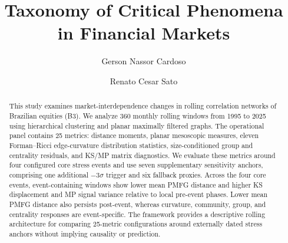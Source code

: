 \documentclass[a4paper,fleqn,review]{cas-sc}
\begin{document}
\let\WriteBookmarks\relax
\def\floatpagepagefraction{1}
\def\textpagefraction{.001}

\title[mode = title]{Taxonomy of Critical Phenomena in Financial Markets}

\author[1]{Gerson Nassor Cardoso}
\cormark[1]
\fnmark[1]

\author[1]{Renato Cesar Sato}


\begin{abstract}
This study examines market-interdependence changes in rolling correlation networks of Brazilian equities (B3). We analyze 360 monthly rolling windows from 1995 to 2025 using hierarchical clustering and planar maximally filtered graphs. The operational panel contains 25 metrics: distance moments, planar mesoscopic measures, eleven Forman--Ricci edge-curvature distribution statistics, size-conditioned group and centrality residuals, and KS/MP matrix diagnostics. We evaluate these metrics around four configured core stress events and use seven supplementary sensitivity anchors, comprising one additional $-3\sigma$ trigger and six fallback proxies. Across the four core events, event-containing windows show lower mean PMFG distance and higher KS displacement and MP signal variance relative to local pre-event phases. Lower mean PMFG distance also persists post-event, whereas curvature, community, group, and centrality responses are event-specific. The framework provides a descriptive rolling architecture for comparing 25-metric configurations around externally dated stress anchors without implying causality or prediction.
\end{abstract}
\end{document}
